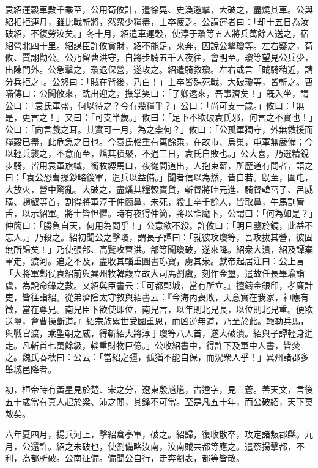 \begin{pinyinscope}
袁紹運穀車數千乘至，公用荀攸計，遣徐晃、史渙邀擊，大破之，盡燒其車。公與紹相拒連月，雖比戰斬將，然衆少糧盡，士卒疲乏。公謂運者曰：「却十五日為汝破紹，不復勞汝矣。」冬十月，紹遣車運穀，使淳于瓊等五人將兵萬餘人送之，宿紹營北四十里。紹謀臣許攸貪財，紹不能足，來奔，因說公擊瓊等。左右疑之，荀攸、賈詡勸公。公乃留曹洪守，自將步騎五千人夜往，會明至。瓊等望見公兵少，出陳門外。公急擊之，瓊退保營，遂攻之。紹遣騎救瓊。左右或言「賊騎稍近，請分兵拒之」。公怒曰：「賊在背後，乃白！」士卒皆殊死戰，大破瓊等，皆斬之。曹瞞傳曰：公聞攸來，跣出迎之，撫掌笑曰：「子卿遠來，吾事濟矣！」旣入坐，謂公曰：「袁氏軍盛，何以待之？今有幾糧乎？」公曰：「尚可支一歲。」攸曰：「無是，更言之！」又曰：「可支半歲。」攸曰：「足下不欲破袁氏邪，何言之不實也！」公曰：「向言戲之耳。其實可一月，為之柰何？」攸曰：「公孤軍獨守，外無救援而糧穀已盡，此危急之日也。今袁氏輜重有萬餘乘，在故市、烏巢，屯軍無嚴備；今以輕兵襲之，不意而至，燔其積聚，不過三日，袁氏自敗也。」公大喜，乃選精銳步騎，皆用袁軍旗幟，銜枚縛馬口，夜從間道出，人抱束薪，所歷道有問者，語之曰：「袁公恐曹操鈔略後軍，遣兵以益備。」聞者信以為然，皆自若。旣至，圍屯，大放火，營中驚亂。大破之，盡燔其糧穀寶貨，斬督將眭元進、騎督韓莒子、呂威璜、趙叡等首，割得將軍淳于仲簡鼻，未死，殺士卒千餘人，皆取鼻，牛馬割脣舌，以示紹軍。將士皆怛懼。時有夜得仲簡，將以詣麾下，公謂曰：「何為如是？」仲簡曰：「勝負自天，何用為問乎！」公意欲不殺。許攸曰：「明且鑒於鏡，此益不忘人。」乃殺之。紹初聞公之擊瓊，謂長子譚曰：「就彼攻瓊等，吾攻拔其營，彼固無所歸矣！」乃使張郃、高覽攻曹洪。郃等聞瓊破，遂來降。紹衆大潰，紹及譚棄軍走，渡河。追之不及，盡收其輜重圖書珎寶，虜其衆。獻帝起居注曰：公上言「大將軍鄴侯袁紹前與兾州牧韓馥立故大司馬劉虞，刻作金璽，遣故任長畢瑜詣虞，為說命錄之數。又紹與臣書云：『可都鄄城，當有所立。』擅鑄金銀印，孝廉計吏，皆往詣紹。從弟濟陰太守敘與紹書云：『今海內喪敗，天意實在我家，神應有徵，當在尊兄。南兄臣下欲使即位，南兄言，以年則北兄長，以位則北兄重。便欲送璽，會曹操斷道。』紹宗族累世受國重恩，而凶逆無道，乃至於此。輙勒兵馬，與戰官渡，乘聖朝之威，得斬紹大將淳于瓊等八人首，遂大破潰。紹與子譚輕身迸走。凡斬首七萬餘級，輜重財物巨億。」公收紹書中，得許下及軍中人書，皆焚之。魏氏春秋曰：公云：「當紹之彊，孤猶不能自保，而況衆人乎！」兾州諸郡多舉城邑降者。

初，桓帝時有黃星見於楚、宋之分，遼東殷馗馗，古逵字，見三蒼。善天文，言後五十歲當有真人起於梁、沛之閒，其鋒不可當。至是凡五十年，而公破紹，天下莫敵矣。

六年夏四月，揚兵河上，擊紹倉亭軍，破之。紹歸，復收散卒，攻定諸叛郡縣。九月，公還許。紹之未破也，使劉備略汝南，汝南賊共都等應之。遣蔡揚擊都，不利，為都所破。公南征備。備聞公自行，走奔劉表，都等皆散。


\end{pinyinscope}
